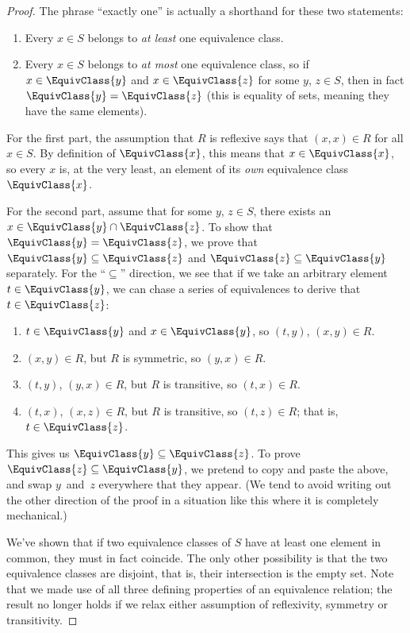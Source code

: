 \documentclass[../generics]{subfiles}
\begin{document}
\begin{proof}
The phrase ``exactly one'' is actually a shorthand for these two statements:
\begin{enumerate}
\item Every $x\in S$ belongs to \emph{at least} one equivalence class.
\item Every $x\in S$ belongs to \emph{at most} one equivalence class, so if $x\in\EquivClass{y}$ and $x\in\EquivClass{z}$ for some $y$, $z\in S$, then in fact $\EquivClass{y}=\EquivClass{z}$ (this is equality of sets, meaning they have the same elements).
\end{enumerate}

For the first part, the assumption that $R$ is reflexive says that $(x,x)\in R$ for all $x\in S$. By definition of $\EquivClass{x}$, this means that $x\in\EquivClass{x}$, so every $x$ is, at the very least, an element of its \emph{own} equivalence class $\EquivClass{x}$.

For the second part, assume that for some $y$, $z\in S$, there exists an $x\in\EquivClass{y}\cap\EquivClass{z}$. To show that $\EquivClass{y}=\EquivClass{z}$, we prove that $\EquivClass{y}\subseteq\EquivClass{z}$ and $\EquivClass{z}\subseteq\EquivClass{y}$ separately. For the ``$\subseteq$'' direction, we see that if we take an arbitrary element $t\in\EquivClass{y}$, we can chase a series of equivalences to derive that $t\in\EquivClass{z}$:
\begin{enumerate}
\item $t\in\EquivClass{y}$ and $x\in\EquivClass{y}$, so $(t,y)$, $(x,y)\in R$.
\item $(x,y)\in R$, but $R$ is symmetric, so $(y,x)\in R$.
\item $(t,y)$, $(y,x)\in R$, but $R$ is transitive, so $(t,x)\in R$.
\item $(t,x)$, $(x,z)\in R$, but $R$ is transitive, so $(t,z)\in R$; that is, $t\in\EquivClass{z}$.
\end{enumerate}
This gives us $\EquivClass{y}\subseteq\EquivClass{z}$. To prove $\EquivClass{z}\subseteq\EquivClass{y}$, we pretend to copy and paste the above, and swap $y$~and~$z$ everywhere that they appear. (We tend to avoid writing out the other direction of the proof in a situation like this where it is completely mechanical.)

We've shown that if two equivalence classes of $S$ have at least one element in common, they must in fact coincide. The only other possibility is that the two equivalence classes are disjoint, that is, their intersection is the empty set. Note that we made use of all three defining properties of an equivalence relation; the result no longer holds if we relax either assumption of reflexivity, symmetry or transitivity.
\end{proof}
\end{document}
